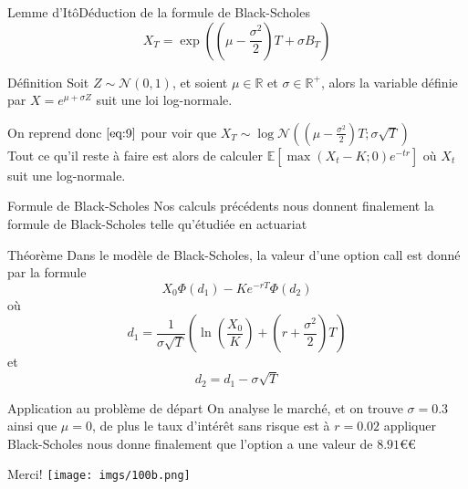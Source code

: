 \documentclass{beamer}
\newcommand{\1}{\mathmybb{1}}
\begin{document}
   \begin{frame}{Lemme d'Itô}{Déduction de la formule de Black-Scholes}
\begin{equation} \label{eq:9}
       X_{T} = \exp \left(  \left( \mu - \frac{\sigma^{2}}{2} \right) T + \sigma B_{T} \right)
     \end{equation}

     \pause
     \begin{block}{Définition}
       Soit $Z \sim \mathcal{N}\left(0, 1 \right)$, et soient $\mu \in \mathbb{R}$ et $\sigma \in \mathbb{R}^{+}$, alors la variable définie par $ X = e^{\mu + \sigma Z}$ suit une loi log-normale.
     \end{block}
     On reprend donc $ \ref{eq:9} $ pour voir que $X_{T} \sim \log \mathcal{N} \left( \left( \mu - \frac{\sigma^{2}}{2} \right) T; \sigma \sqrt{T}  \right)$ \\
     \pause
     Tout ce qu'il reste à faire est alors de calculer $\mathbb{E}\left[\max(X_{t} - K; 0)e^{-tr}\right]$ où $ X_{t}$ suit une log-normale.
   \end{frame}
   \begin{frame}{Formule de Black-Scholes}
     Nos calculs précédents nous donnent finalement la formule de Black-Scholes telle qu'étudiée en actuariat
     \begin{block}{Théorème}
       Dans le modèle de Black-Scholes, la valeur d'une option call est donné par la formule
       \begin{equation}
         X_{0}\varPhi(d_{1}) - Ke^{-rT}\varPhi(d_{2})
       \end{equation}
       où
       \[
         d_{1} = \frac{1}{\sigma \sqrt{T}} \left( \ln \left(\frac{X_{0}}{K} \right) + \left( r + \frac{\sigma^{2}}{2} \right)T \right)
       \]
       et
       \[
         d_{2} = d_{1} - \sigma \sqrt{T}
       \]
    \end{block}
  \end{frame}
  \begin{frame}{Application au problème de départ}
    On analyse le marché, et on trouve $ \sigma = 0.3$ ainsi que $ \mu = 0$, de plus le taux d'intérêt sans risque est à $r = 0.02$ appliquer Black-Scholes nous donne finalement que l'option a une valeur de $8.91€$€
  \end{frame}
  \begin{frame}{Merci!}
    \texttt{[image: imgs/100b.png]}
  \end{frame}
\end{document}
